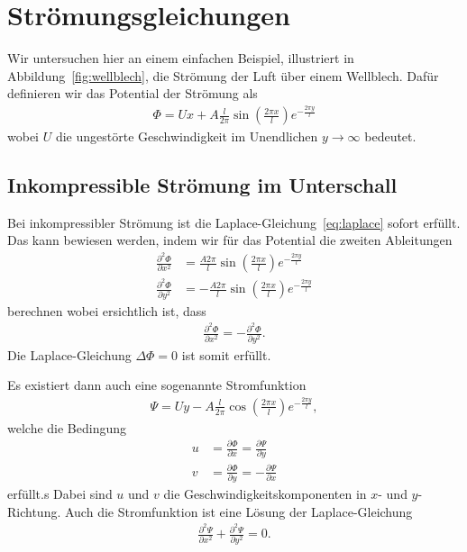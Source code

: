%
%
%
\section{Strömungsgleichungen\label{ueberschall:stroemungsgleichung}}
Wir untersuchen hier an einem einfachen Beispiel, 
illustriert in Abbildung~\ref{fig:wellblech},
die Strömung der Luft über einem Wellblech.
Dafür definieren wir das Potential der Strömung als
\begin{align*}
    \Phi
    =
    U x + A \frac{l}{2 \pi} \sin\left(\frac{2 \pi x}{l}\right)
    e^{-\frac{2 \pi y}{l}}
\end{align*}
wobei $U$ die ungestörte Geschwindigkeit im 
Unendlichen $y\rightarrow\infty$ bedeutet.


\subsection{Inkompressible Strömung im Unterschall}
Bei inkompressibler Strömung ist die
Laplace-Gleichung~\eqref{eq:laplace} sofort erfüllt.
Das kann bewiesen werden, indem wir für das Potential
die zweiten Ableitungen
\begin{align*}
    \frac{\partial^2 \Phi}{\partial x^2}
    &= \frac{A 2 \pi}{l} \sin\left(\frac{2 \pi x}{l}\right)
    e^{-\frac{2 \pi y}{l}} \\
    \frac{\partial^2 \Phi}{\partial y^2}
    &= -\frac{A 2 \pi}{l} \sin\left(\frac{2 \pi x}{l}\right)
     e^{-\frac{2 \pi y}{l}}
\end{align*}
berechnen wobei ersichtlich ist, dass
\begin{align*}
    \frac{\partial^2 \Phi}{\partial x^2}
    =
    -\frac{\partial^2 \Phi}{\partial y^2}.
\end{align*}
Die Laplace-Gleichung $\Delta \Phi = 0$ ist somit erfüllt.

Es existiert dann auch eine sogenannte Stromfunktion
\begin{align*}
    \Psi
    =
    U y - A \frac{l}{2 \pi} \cos\left(\frac{2 \pi x}{l}\right)
     e^{-\frac{2 \pi y}{l}},
\end{align*}
welche die Bedingung
\begin{align*}
    u 
    &=
    \frac{\partial \Phi}{\partial x}
    =
    \frac{\partial \Psi}{\partial y}
    \\
    v
    &=
    \frac{\partial \Phi}{\partial y}
    =
    -\frac{\partial \Psi}{\partial x}
\end{align*}
erfüllt.s
Dabei sind $u$ und $v$ die Geschwindigkeitskomponenten in $x$- und $y$-Richtung.
Auch die Stromfunktion ist eine Lösung der Laplace-Gleichung
\begin{align*}
    \frac{\partial^2 \Psi}{\partial x^2}
    +
    \frac{\partial^2 \Psi}{\partial y^2}
    =
    0.
\end{align*}

